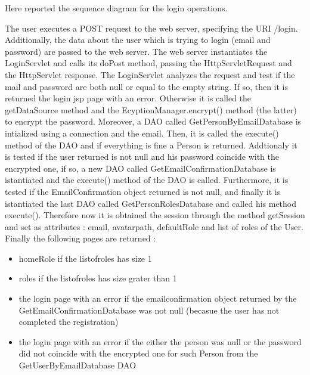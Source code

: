 \begin{flushleft}
Here reported the sequence diagram for the login operations. 

The user executes a POST request to the web server, specifying the URI /login. Additionally, the data about the user which is trying to login (email and password) are passed to the web server. The web server instantiates the LoginServlet and calls its doPost method, passing the HttpServletRequest and the HttpServlet response. The LoginServlet analyzes the request and test if the mail and password are both  null or equal to the empty string. If so, then it is returned the login jsp page with an error. Otherwise it is called the getDataSource method and the EcyptionManager.encrypt() method (the latter) to encrypt the password. Moreover, a DAO called GetPersonByEmailDatabase is intialized using a connection and the email. Then, it is called the execute() method of the DAO and if everything is fine a Person is returned. Addtionaly it is tested if the user returned is not null and his password coincide with the encrypted one, if so, a new DAO called GetEmailConfirmationDatabase is istantiated and the execute() method of the DAO is called. Furthermore, it is tested if the EmailConfirmation object returned is not null, and finally it is istantiated the last DAO called GetPersonRolesDatabase and called his method execute().
Therefore now it is obtained the session through the method getSession and set as attributes : email, avatarpath, defaultRole and list of roles of the User.
Finally the following pages are returned :
\begin{itemize}
	\item homeRole if the listofroles has size 1
	\item roles if the listofroles has size grater than 1
	\item the login page with an error if the emailconfirmation object returned by the GetEmailConfirmationDatabase was not null (becasue the user has not completed the registration) 
	\item the login page with an error if the either the person was null or the password did not coincide with the encrypted one for such Person from the GetUserByEmailDatabase DAO
\end{itemize}

\end{flushleft}



